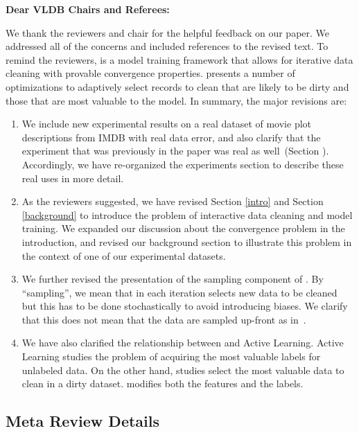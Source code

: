 {\noindent \normalsize \bf Dear VLDB Chairs and Referees: }

\vspace{.5em}

We thank the reviewers and chair for the helpful feedback on our paper. 
We addressed all of the concerns and included references to the revised text. 
To remind the reviewers, \sys is a model training framework that allows for iterative data cleaning with provable convergence properties.
\sys presents a number of optimizations to adaptively select records to clean that are likely to be dirty and those that are most valuable to the model.
In summary, the major revisions are:

\begin{enumerate}
\item We include new experimental results on a real dataset of movie plot descriptions from IMDB with real data error, and also clarify that the experiment that was previously in the paper was real as well~(Section \label{real-errors}). Accordingly, we have re-organized the experiments section to describe these real uses in more detail.

\item As the reviewers suggested, we have revised Section \ref{intro} and Section \ref{background} to introduce the problem of interactive data cleaning and model training. We expanded our discussion about the convergence problem in the introduction, and revised our background section to illustrate this problem in the context of one of our experimental datasets.

\item We further revised the presentation of the sampling component of \sys. By ``sampling'', we mean that in each iteration \sys selects new data to be cleaned but this has to be done stochastically to avoid introducing biases. We clarify that this does not mean that the data are sampled up-front as in~\cite{wang1999sample}.

\item We have also clarified the relationship between \sys and Active Learning. Active Learning studies the problem of acquiring the most valuable labels for unlabeled data. On the other hand, \sys studies select the most valuable data to clean in a dirty dataset. \sys modifies both the features and the labels.

\end{enumerate}

\subsection*{Meta Review Details} 

